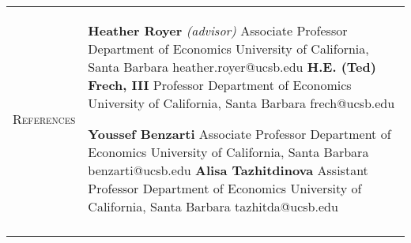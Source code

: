 \documentclass[11pt]{article}
\begin{document}
\begin{tabularx}{\textwidth}{@{}Y Z@{}}
	\newpage 
	\textsc{References}  & 
	\begin{minipage}[t]{0.41\textwidth}
		\textbf{Heather Royer} \textit{(advisor)} \newline
		Associate Professor \newline
		Department of Economics \newline
		University of California, Santa Barbara \newline
		heather.royer@ucsb.edu 
		\vspace{20pt} \newline
		\textbf{H.E. (Ted) Frech, III} \newline
		Professor \newline
		Department of Economics \newline
		University of California, Santa Barbara \newline
		frech@ucsb.edu
	\end{minipage}\begin{minipage}[t]{0.5\textwidth}
		\textbf{Youssef Benzarti}  \newline
		Associate Professor \newline
		Department of Economics \newline
		University of California, Santa Barbara \newline
		benzarti@ucsb.edu
		\vspace{20pt} \newline
		\textbf{Alisa Tazhitdinova} \newline
		Assistant Professor \newline
		Department of Economics \newline
		University of California, Santa Barbara \newline
		tazhitda@ucsb.edu
	\end{minipage}
	\newline  \\ \addlinespace[20pt] 
	

\end{tabularx}
\end{document}
